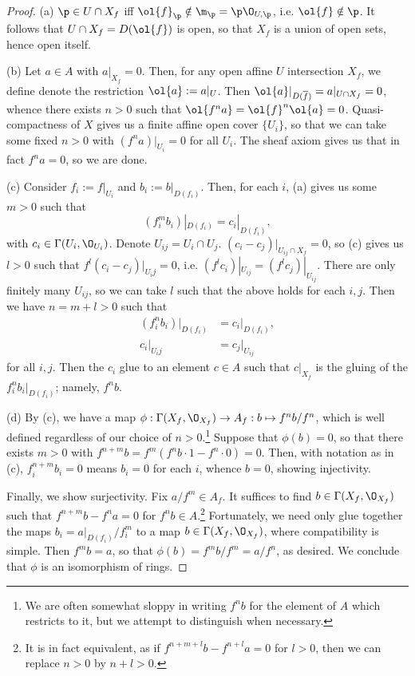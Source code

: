 \documentclass[12pt]{amsart}
\begin{document}
\begin{proof}
  (a) $\p\in U\cap X_f$ iff $\ol{f}_\p\notin \m_\p=\p\O_{U,\p}$, i.e. $\ol{f}\notin \p$.
  It follows that $U\cap X_f= D(\ol{f})$ is open, so that $X_f$ is a union of open sets, hence open itself.

  (b) Let $a\in A$ with $a|_{X_f}=0$.
  Then, for any open affine $U$ intersection $X_f$, we define denote the restriction $\ol{a}:=a|_U$.
  Then $\ol{a}|_{D(\overline{f})}=a|_{U\cap X_f}=0$, whence there exists $n >0$ such that $\ol{f^na}=\ol{f}^n \ol{a} =0$.
  Quasi-compactness of $X$ gives us a finite affine open cover $\{U_i\}$, so that we can take some fixed $n>0$ with $(f^na)|_{U_i}=0$ for all $U_i$.
  The sheaf axiom gives us that in fact $f^na=0$, so we are done.

  (c) Consider $f_i:=f|_{U_i}$ and $b_i:=b|_{D(f_i)}$.
  Then, for each $i$, (a) gives us some $m>0$ such that 
  \[
    (f_i^mb_i)|_{D(f_i)}=c_i|_{D(f_i)},
  \]
  with $c_i\in \Gamma(U_i,\O_{U_i})$.
  Denote $U_{ij}=U_i\cap U_j$.
  $(c_i-c_j)|_{U_{ij}\cap X_f} = 0$, so (c) gives us $l>0$ such that $f^l(c_i-c_j)|_{U_ij} = 0$, i.e. $(f^lc_i)|_{U_{ij}}=(f^lc_j)|_{U_{ij}}$.
  There are only finitely many $U_{ij}$, so we can take $l$ such that the above holds for each $i,j$. 
  Then we have $n= m+l>0$ such that 
  \begin{align*}
    (f_i^nb_i)|_{D(f_i)} &= c_i|_{D(f_i)}, \\ 
    c_i|_{U_ij} & = c_j|_{U_{ij}}
  \end{align*}
  for all $i,j$.
  Then the $c_i$ glue to an element $c\in A$ such that $c|_{X_f}$ is the gluing of the $f_i^nb_i|_{D(f_i)}$; namely, $f^nb$.
  
  (d) By (c), we have a map $\phi:\Gamma(X_f,\O_{X_f})\to A_f:b\mapsto f^nb/f^n$, which is well defined regardless of our choice of $n>0$.\footnote{We are often somewhat sloppy in writing $f^nb$ for the element of $A$ which restricts to it, but we attempt to distinguish when necessary.}
  Suppose that $\phi(b)=0$, so that there exists $m>0$ with $f^{n+m}b =f^m(f^nb\cdot 1 - f^n\cdot 0) = 0$.
  Then, with notation as in (c), $f_i^{n+m}b_i=0$ means $b_i=0$ for each $i$, whence $b=0$, showing injectivity.

  Finally, we show surjectivity.
  Fix $a/f^m\in A_f$.
  It suffices to find $b\in \Gamma(X_f,\O_{X_f})$ such that $f^{n+m}b-f^na=0$ for $f^nb\in A$.\footnote{It is in fact equivalent, as if $f^{n+m+l}b-f^{n+l}a=0$ for $l>0$, then we can replace $n>0$ by $n+l>0$.}
  Fortunately, we need only glue together the maps $b_i = a|_{D(f_i)}/f_i^m$ to a map $b\in \Gamma(X_f,\O_{X_f})$, where compatibility is simple.
  Then $f^mb=a$, so that $\phi(b)=f^mb/f^m=a/f^n$, as desired.
  We conclude that $\phi$ is an isomorphism of rings.
\end{proof}
\end{document}
